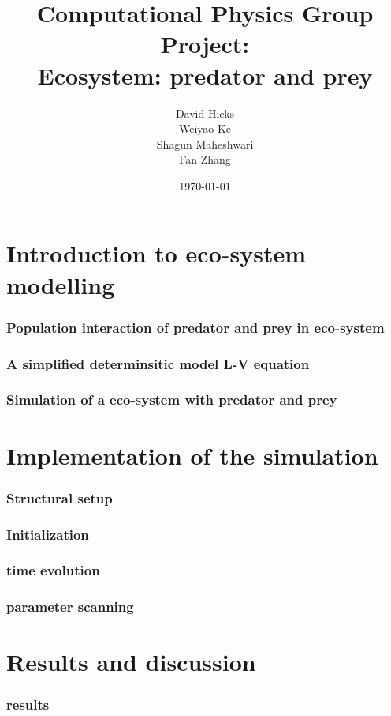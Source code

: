 \documentclass{beamer}
\title{Computational Physics Group Project: \\ Ecosystem: predator and prey}
\author{David Hicks\\ Weiyao Ke \\ Shagun Maheshwari \\ Fan Zhang}
\date{\today}
\begin{document}
\frame{\titlepage}

\section[Outline]{}
\frame{\tableofcontents}

\section{Introduction to eco-system modelling}
\frame
{
  \frametitle{Population interaction of predator and prey in eco-system}
  
}
\frame
{
  \frametitle{A simplified determinsitic model L-V equation}
  
}
\frame
{
  \frametitle{Simulation of a eco-system with predator and prey}
  
}

\section{Implementation of the simulation}
\frame
{
  \frametitle{Structural setup}
  
}

\frame
{
  \frametitle{Initialization}
  
}

\frame
{
  \frametitle{time evolution}
  
}

\frame
{
  \frametitle{parameter scanning}
  
}

\section{Results and discussion}
\frame
{
  \frametitle{results}
  
}
\end{document}
